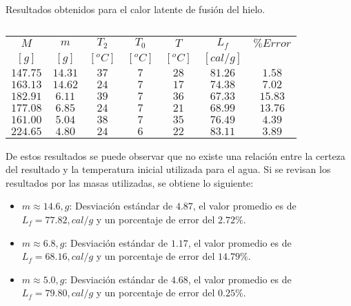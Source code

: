 \documentclass[10pt]{article}
\begin{document}
\begin{multicols*}{2}
    \begin{table}[H]
        \centering
        \caption{Resultados obtenidos para el calor latente de fusión del hielo.}
        \begin{tabular}{ccccccc}
            \hline\hline
            \textbf{$M$} & \textbf{$m$} & \textbf{$T_2$} & \textbf{$T_0$} & \textbf{$T$}   & \textbf{$L_f$}     & \textbf{$\% Error$} \\
            \small $[g]$ & \small $[g]$ & \small $[^oC]$ & \small $[^oC]$ & \small $[^oC]$ & \small $[cal / g]$ &                     \\
            \hline\hline
            $147.75$     & $14.31$      & $37$           & $7$            & $28$           & $81.26$            & $1.58$              \\
            $163.13$     & $14.62$      & $24$           & $7$            & $17$           & $74.38$            & $7.02$              \\
            \hline
            $182.91$     & $6.11$       & $39$           & $7$            & $36$           & $67.33$            & $15.83$             \\
            $177.08$     & $6.85$       & $24$           & $7$            & $21$           & $68.99$            & $13.76$             \\
            \hline
            $161.00$     & $5.04$       & $38$           & $7$            & $35$           & $76.49$            & $4.39$              \\
            $224.65$     & $4.80$       & $24$           & $6$            & $22$           & $83.11$            & $3.89$              \\
            \hline
        \end{tabular}
        \caption*{}
        \label{tab:calor_latente}
    \end{table}

    De estos resultados se puede observar que no existe una relación entre la
    certeza del resultado y la temperatura inicial utilizada para el agua. Si se
    revisan los resultados por las masas utilizadas, se obtiene lo siguiente:

    \begin{itemize}
        \item $m \approx 14.6 , g$: Desviación estándar de $4.87$, el valor promedio es de $L_f = 77.82 , cal / g$ y un porcentaje de error del $2.72 \%$.
        \item $m \approx 6.8 , g$: Desviación estándar de $1.17$, el valor promedio es de $L_f = 68.16 , cal / g$ y un porcentaje de error del $14.79 \%$.
        \item $m \approx 5.0 , g$: Desviación estándar de $4.68$, el valor promedio es de $L_f = 79.80 , cal / g$ y un porcentaje de error del $0.25 \%$.
    \end{itemize}


\end{multicols*}
\end{document}
